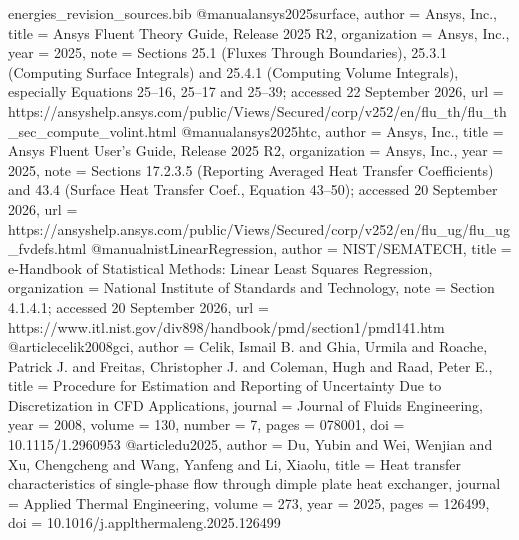\begin{filecontents*}[overwrite]{energies_revision_sources.bib}
@manual{ansys2025surface,
  author = {{Ansys, Inc.}},
  title = {{Ansys Fluent Theory Guide, Release 2025 R2}},
  organization = {Ansys, Inc.},
  year = {2025},
  note = {Sections 25.1 (Fluxes Through Boundaries), 25.3.1 (Computing Surface Integrals) and 25.4.1 (Computing Volume Integrals), especially Equations 25--16, 25--17 and 25--39; accessed 22 September 2026},
  url = {https://ansyshelp.ansys.com/public/Views/Secured/corp/v252/en/flu_th/flu_th_sec_compute_volint.html}
}
@manual{ansys2025htc,
  author = {{Ansys, Inc.}},
  title = {{Ansys Fluent User's Guide, Release 2025 R2}},
  organization = {Ansys, Inc.},
  year = {2025},
  note = {Sections 17.2.3.5 (Reporting Averaged Heat Transfer Coefficients) and 43.4 (Surface Heat Transfer Coef., Equation 43--50); accessed 20 September 2026},
  url = {https://ansyshelp.ansys.com/public/Views/Secured/corp/v252/en/flu_ug/flu_ug_fvdefs.html}
}
@manual{nistLinearRegression,
  author = {{NIST/SEMATECH}},
  title = {{e-Handbook of Statistical Methods: Linear Least Squares Regression}},
  organization = {National Institute of Standards and Technology},
  note = {Section 4.1.4.1; accessed 20 September 2026},
  url = {https://www.itl.nist.gov/div898/handbook/pmd/section1/pmd141.htm}
}
@article{celik2008gci,
  author = {Celik, Ismail B. and Ghia, Urmila and Roache, Patrick J. and Freitas, Christopher J. and Coleman, Hugh and Raad, Peter E.},
  title = {Procedure for Estimation and Reporting of Uncertainty Due to Discretization in {CFD} Applications},
  journal = {Journal of Fluids Engineering},
  year = {2008},
  volume = {130},
  number = {7},
  pages = {078001},
  doi = {10.1115/1.2960953}
}
@article{du2025,
  author = {Du, Yubin and Wei, Wenjian and Xu, Chengcheng and Wang, Yanfeng and Li, Xiaolu},
  title = {Heat transfer characteristics of single-phase flow through dimple plate heat exchanger},
  journal = {Applied Thermal Engineering},
  volume = {273},
  year = {2025},
  pages = {126499},
  doi = {10.1016/j.applthermaleng.2025.126499}
}
\end{filecontents*}
